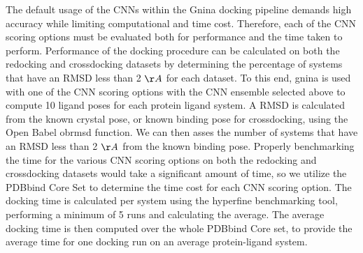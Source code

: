 \documentclass[journal=jcisd8,manuscript=article]{achemso}
\begin{document}
The default usage of the CNNs within the Gnina docking pipeline demands high accuracy while limiting computational and time cost. Therefore, each of the CNN scoring options must be evaluated both for performance and the time taken to perform. Performance of the docking procedure can be calculated on both the redocking and crossdocking datasets by determining the percentage of systems that have an RMSD less than 2 $\AA$ for each dataset. To this end, gnina is used with one of the CNN scoring options with the CNN ensemble selected above to compute 10 ligand poses for each protein ligand system. A RMSD is calculated from the known crystal pose, or known binding pose for crossdocking, using the Open Babel obrmsd function. We can then asses the number of systems that have an RMSD less than 2 $\AA$ from the known binding pose. Properly benchmarking the time for the various CNN scoring options on both the redocking and crossdocking datasets would take a significant amount of time, so we utilize the PDBbind Core Set to determine the time cost for each CNN scoring option. The docking time is calculated per system using the hyperfine benchmarking tool\cite{}, performing a minimum of 5 runs and calculating the average. The average docking time is then computed over the whole PDBbind Core set, to provide the average time for one docking run on an average protein-ligand system.
\end{document}
